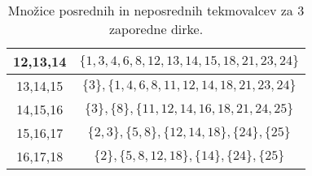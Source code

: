 \documentclass[a4paper, 12pt]{book}
\begin{document}
\begin{table}
\begin{center}
\begin{tabular}{ |c|c| }
        \hline
            12,13,14 & $\{1, 3, 4, 6, 8, 12, 13, 14, 15, 18, 21, 23, 24\}$ \\ 
        \hline
            13,14,15 & $\{3\}, \{1, 4, 6, 8, 11, 12, 14, 18, 21, 23, 24\}$ \\ 
        \hline
            14,15,16 & $\{3\}, \{8\}, \{11, 12, 14, 16, 18, 21, 24, 25\}$ \\ 
        \hline
            15,16,17 & $\{2, 3\}, \{5, 8\}, \{12, 14, 18\}, \{24\}, \{25\}$ \\ 
        \hline
            16,17,18 & $\{2\}, \{5, 8, 12, 18\}, \{14\}, \{24\}, \{25\}$ \\ 
        \hline
    \end{tabular}
\end{center}
\caption{ Množice posrednih in neposrednih tekmovalcev za 3 zaporedne dirke. }
\label{tbl:tabelaPosrednihNeposrednihTekmovalcev3}
\end{table}
\end{document}
